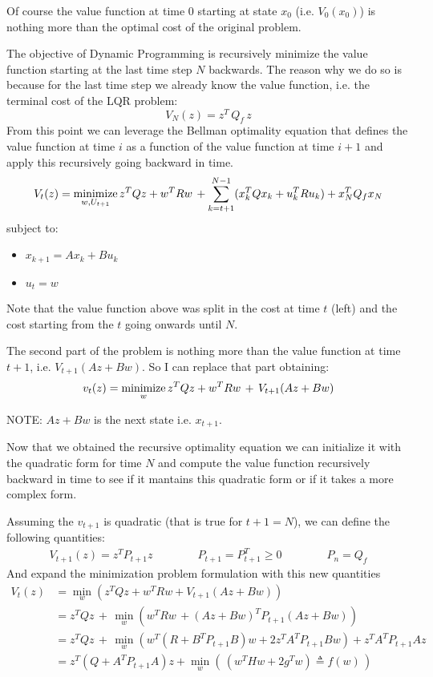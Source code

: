 Of course the value function at time $0$ starting at state $x_0$ (i.e. $V_0(x_0)$) is nothing more than the optimal cost of the original problem.

The objective of Dynamic Programming is recursively minimize the value function starting at the last time step $N$ backwards.
The reason why we do so is because for the last time step we already know the value function, i.e. the terminal cost of the LQR problem:
\[V_N(z) = z^T\,Q_f\,z\]
From this point we can leverage the Bellman optimality equation that defines the value function at time $i$ as a function of the value function at time $i+1$ and apply this recursively going backward in time.
\[V_t(z) = \operatorname*{minimize}_{w, U_{t+1}} z^TQz + w^TRw\,+\sum_{k=t+1}^{N-1}(x_k^TQx_k + u_k^TRu_k) + x_N^TQ_fx_N\]
subject to:
\begin{itemize}
\item $x_{k+1}=Ax_k+Bu_k$
\item $u_t = w$
\end{itemize}
Note that the value function above was split in the cost at time $t$ (left) and the cost starting from the $t$ going onwards until $N$.

The second part of the problem is nothing more than the value function at time $t+1$, i.e. $V_{t+1}(Az+Bw)$. So I can replace that part obtaining:
\[v_t(z) = \operatorname*{minimize}_w z^TQz+w^TRw\,+\,V_{t+1}(Az+Bw)\]

NOTE: $Az + Bw$ is the next state i.e. $x_{t+1}$.

Now that we obtained the recursive optimality equation we can initialize it with the quadratic form for time $N$ and compute the value function recursively backward in time to see if it mantains this quadratic form or if it takes a  more complex form.

Assuming the $v_{t+1}$ is quadratic (that is true for $t+1 = N$), we can define the following quantities:
\begin{gather*}
V_{t+1}(z) = z^TP_{t+1}z\qquad\qquad P_{t+1} = P_{t+1}^T\ge 0 \qquad\qquad P_n=Q_f
\end{gather*}
And expand the minimization problem formulation with this new quantities
\begin{align*}
V_t(z) &= \min_w (z^TQz + w^TRw + V_{t+1}(Az+Bw))\\
&=z^TQz\,+\,\min_w(w^TRw\,+(Az+Bw)^TP_{t+1}(Az+Bw))\\
&=z^TQz\,+\,\min_w(w^T(R+B^TP_{t+1}B)w + 2z^TA^TP_{t+1}Bw) + z^TA^TP_{t+1}Az\\
&=z^T(Q+A^TP_{t+1}A)z + \min_w(\,(w^THw + 2g^Tw)\triangleq f(w)\,)
\end{align*}

